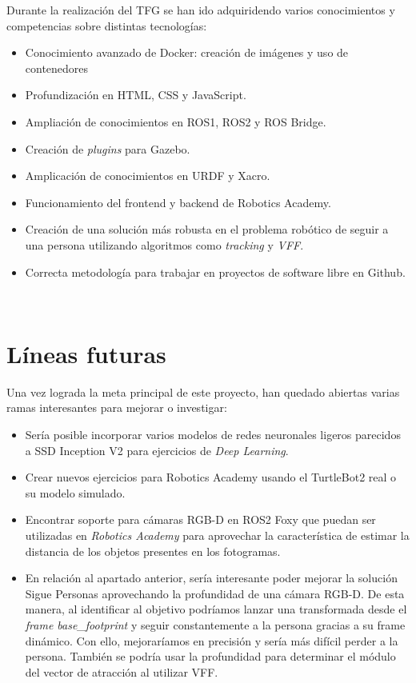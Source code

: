 Durante la realización del TFG se han ido adquiridendo varios conocimientos y competencias sobre distintas tecnologías:

\begin{itemize}
	\item Conocimiento avanzado de Docker: creación de imágenes y uso de contenedores
	\item Profundización en HTML, CSS y JavaScript.
	\item Ampliación de conocimientos en ROS1, ROS2 y ROS Bridge.
	\item Creación de \textit{plugins} para Gazebo.
	\item Amplicación de conocimientos en URDF y Xacro.
	\item Funcionamiento del frontend y backend de Robotics Academy.
	\item Creación de una solución más robusta en el problema robótico de seguir a una persona utilizando algoritmos como \textit{tracking} y \textit{VFF}.
	\item Correcta metodología para trabajar en proyectos de software libre en Github.
\end{itemize}\

\section{Líneas futuras}
\label{sec:lineas_futuras}

Una vez lograda la meta principal de este proyecto, han quedado abiertas varias ramas interesantes para mejorar o investigar:

\begin{itemize}
	\item Sería posible incorporar varios modelos de redes neuronales ligeros parecidos a SSD Inception V2 para ejercicios de \textit{Deep Learning}.
	\item Crear nuevos ejercicios para Robotics Academy usando el TurtleBot2 real o su modelo simulado.
	\item Encontrar soporte para cámaras RGB-D en ROS2 Foxy que puedan ser utilizadas en \textit{Robotics Academy} para aprovechar la característica de estimar la distancia de los objetos presentes en los fotogramas.
	\item En relación al apartado anterior, sería interesante poder mejorar la solución Sigue Personas aprovechando la profundidad de una cámara RGB-D. De esta manera, al identificar al objetivo podríamos lanzar una transformada desde el \textit{frame base\_footprint} y seguir constantemente a la persona gracias a su frame dinámico. Con ello, mejoraríamos en precisión y sería más difícil perder a la persona. También se podría usar la profundidad para determinar el módulo del vector de atracción al utilizar VFF.
\end{itemize}

